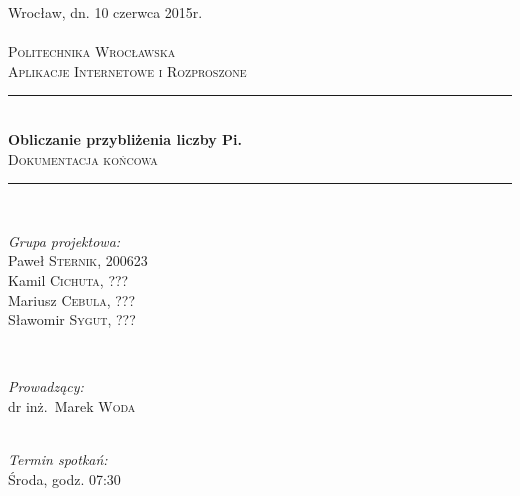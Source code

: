 \documentclass[a4paper,12pt]{article}		%
\newcommand{\Title}{Obliczanie przybliżenia liczby Pi.}
\newcommand{\UnderTitle}{Dokumentacja końcowa}
\newcommand{\University}{Politechnika Wrocławska}
\newcommand{\Class}{Aplikacje Internetowe i Rozproszone}
\newcommand{\ClassDay}{Środa}
\newcommand{\ClassTime}{07:30}
\newcommand{\HRule}{\rule{\linewidth}{0.5mm}}		%
\begin{document}
\begin{titlepage}
\hfill Wrocław, dn. 10 czerwca 2015r.\\
\center
\textsc{}\\[1.5cm]
\textsc{\LARGE \University}\\[1.5cm]
\textsc{\Large \Class}\\[1.5cm]


\HRule \\[0.7cm]
{ \huge \bfseries \Title}\\[0.4cm]
\textsc{\large \UnderTitle}\\[0.5cm]
\HRule \\[1.0cm]


\begin{minipage}{0.5\textwidth}
\begin{flushleft} \large
\emph{Grupa projektowa:}
\\ Paweł \textsc{Sternik}, 200623
\\ Kamil \textsc{Cichuta}, ???
\\ Mariusz \textsc{Cebula}, ???
\\ Sławomir \textsc{Sygut}, ???
\end{flushleft}
\end{minipage}
~
\begin{minipage}{0.4\textwidth}
\begin{flushright} \large
\emph{Prowadzący:}
\\ dr inż.~Marek \textsc{Woda}
\end{flushright}
\end{minipage}\\[3cm]


\emph{Termin spotkań:}\\[0.35cm]
{\large \ClassDay, godz. \ClassTime}\\[0.5cm]
\vfill
\end{titlepage}
\end{document}
